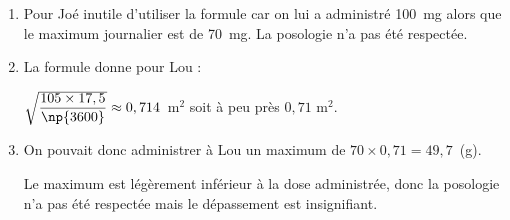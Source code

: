 \documentclass[10pt]{article}
\begin{document}
\begin{enumerate}
\item %
Pour Joé inutile d’utiliser la formule car on lui a administré 100~mg alors que le maximum journalier est de 70~mg. La posologie n’a pas  été respectée.
\item %
La formule donne pour Lou :

$\sqrt{\dfrac{105 \times 17,5}{\np{3600}}} \approx 0,714$~m$^2$ soit à peu près $0,71$ m$^2$.
\medskip

 
\item %
On pouvait donc administrer à Lou un maximum de $70 \times  0,71 = 49,7$~(g).

Le maximum est légèrement inférieur à la dose administrée, donc la posologie n’a pas été respectée mais le dépassement est insignifiant.
\end{enumerate}
\end{document}
